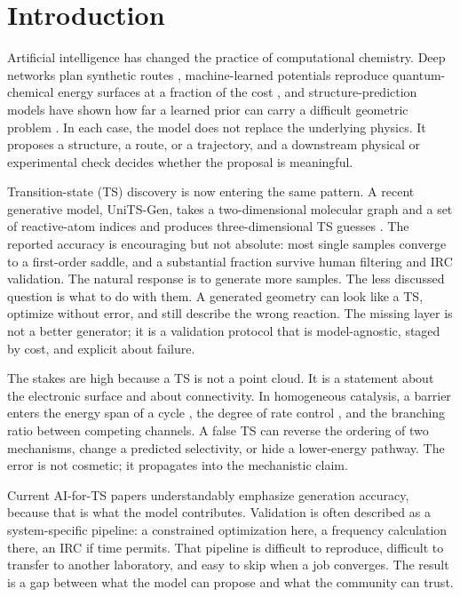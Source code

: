 \documentclass[11pt,a4paper]{article}
\begin{document}
\section{Introduction}

Artificial intelligence has changed the practice of computational chemistry. Deep networks plan synthetic routes \citep{Segler2018}, machine-learned potentials reproduce quantum-chemical energy surfaces at a fraction of the cost \citep{Behler2007,Unke2021}, and structure-prediction models have shown how far a learned prior can carry a difficult geometric problem \citep{Jumper2021}. In each case, the model does not replace the underlying physics. It proposes a structure, a route, or a trajectory, and a downstream physical or experimental check decides whether the proposal is meaningful.

Transition-state (TS) discovery is now entering the same pattern. A recent generative model, UniTS-Gen, takes a two-dimensional molecular graph and a set of reactive-atom indices and produces three-dimensional TS guesses \citep{Xu2026UniTS}. The reported accuracy is encouraging but not absolute: most single samples converge to a first-order saddle, and a substantial fraction survive human filtering and IRC validation. The natural response is to generate more samples. The less discussed question is what to do with them. A generated geometry can look like a TS, optimize without error, and still describe the wrong reaction. The missing layer is not a better generator; it is a validation protocol that is model-agnostic, staged by cost, and explicit about failure.

The stakes are high because a TS is not a point cloud. It is a statement about the electronic surface and about connectivity. In homogeneous catalysis, a barrier enters the energy span of a cycle \citep{Kozuch2011Span}, the degree of rate control \citep{Campbell2017DRC}, and the branching ratio between competing channels. A false TS can reverse the ordering of two mechanisms, change a predicted selectivity, or hide a lower-energy pathway. The error is not cosmetic; it propagates into the mechanistic claim.

Current AI-for-TS papers understandably emphasize generation accuracy, because that is what the model contributes. Validation is often described as a system-specific pipeline: a constrained optimization here, a frequency calculation there, an IRC if time permits. That pipeline is difficult to reproduce, difficult to transfer to another laboratory, and easy to skip when a job converges. The result is a gap between what the model can propose and what the community can trust.
\end{document}
